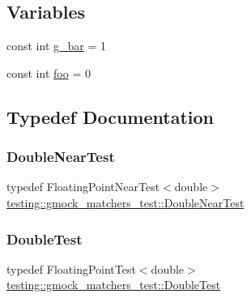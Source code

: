 \subsection*{Variables}
\begin{DoxyCompactItemize}
\item 
const int \mbox{\hyperlink{namespacetesting_1_1gmock__matchers__test_a55dcc962203a3a3361d2e7e00ed99b4d}{g\+\_\+bar}} = 1
\item 
const int \mbox{\hyperlink{namespacetesting_1_1gmock__matchers__test_a3536e68112ffbb1f76887cd15bb45c15}{foo}} = 0
\end{DoxyCompactItemize}


\subsection{Typedef Documentation}
\mbox{\label{namespacetesting_1_1gmock__matchers__test_aea537d0183ccc65b5c49a75d711993c8}} 
\subsubsection{\texorpdfstring{DoubleNearTest}{DoubleNearTest}}
{\footnotesize\ttfamily typedef Floating\+Point\+Near\+Test$<$double$>$ \mbox{\hyperlink{namespacetesting_1_1gmock__matchers__test_aea537d0183ccc65b5c49a75d711993c8}{testing\+::gmock\+\_\+matchers\+\_\+test\+::\+Double\+Near\+Test}}}

\mbox{\label{namespacetesting_1_1gmock__matchers__test_a944cdd366ed240f29ae8e3ebc753ad5c}} 
\subsubsection{\texorpdfstring{DoubleTest}{DoubleTest}}
{\footnotesize\ttfamily typedef Floating\+Point\+Test$<$double$>$ \mbox{\hyperlink{namespacetesting_1_1gmock__matchers__test_a944cdd366ed240f29ae8e3ebc753ad5c}{testing\+::gmock\+\_\+matchers\+\_\+test\+::\+Double\+Test}}}

